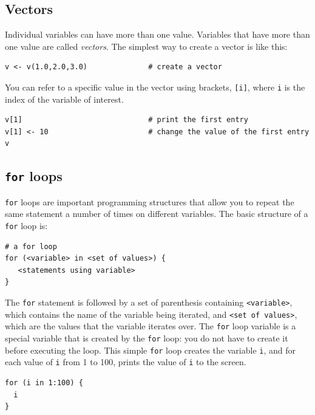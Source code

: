 \subsection{Vectors}
Individual variables can have more than one value.
Variables that have more than one value are called \emph{vectors}.
The simplest way to create a vector is like this:
{\tt \begin{snugshade*}
\begin{lstlisting}    
v <- v(1.0,2.0,3.0)              # create a vector
\end{lstlisting}
\end{snugshade*}}
\noindent You can refer to a specific value in the vector using brackets, \texttt{[i]}, where \texttt{i} is the index of the variable of interest.
{\tt \begin{snugshade*}
\begin{lstlisting}    
v[1]                             # print the first entry
v[1] <- 10                       # change the value of the first entry
v
\end{lstlisting}
\end{snugshade*}}



\subsection{\texttt{for} loops}
\texttt{for} loops are important programming structures that allow you to repeat the same statement a number of times on different variables.
The basic structure of a \texttt{for} loop is:
{\tt \begin{snugshade*}
\begin{lstlisting}    
# a for loop
for (<variable> in <set of values>) {
   <statements using variable>
}
\end{lstlisting}
\end{snugshade*}}
\noindent The \texttt{for} statement is followed by a set of parenthesis containing \texttt{<variable>}, which contains the name of the variable being iterated, and \texttt{<set of values>}, which are the values that the variable iterates over.
The \texttt{for} loop variable is a special variable that is created by the \texttt{for} loop: you do not have to create it before executing the loop.
This simple \texttt{for} loop creates the variable \texttt{i}, and for each value of \texttt{i} from 1 to 100, prints the value of \texttt{i} to the screen.
{\tt \begin{snugshade*}
\begin{lstlisting}    
for (i in 1:100) {
  i
}
\end{lstlisting}
\end{snugshade*}}

